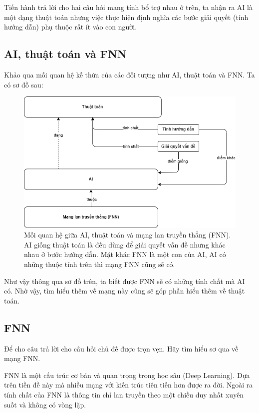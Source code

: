 	Tiến hành trả lời cho hai câu hỏi mang tính bổ trợ nhau ở trên, ta nhận ra AI là một dạng thuật toán nhưng việc thực hiện định nghĩa các bước giải quyết (tính hướng dẫn) phụ thuộc rất ít vào con người.

\subsection{AI, thuật toán và FNN}
	Khảo qua mối quan hệ kế thừa của các đối tượng như AI, thuật toán và FNN. Ta có sơ đồ sau:
	
	\begin{figure}[h]
		\centering
		\includegraphics[scale=0.6]{figures/ai_fnn_algorithm.png}
		\caption{Mối quan hệ giữa AI, thuật toán và mạng lan truyền thẳng (FNN). AI giống thuật toán là đều dùng để giải quyết vấn đề nhưng khác nhau ở bước hướng dẫn. Mặt khác FNN là một con của AI, AI có những thuộc tính trên thì mạng FNN cũng sẽ có.}
		\label{fig:ai_fnn_algo_relationship}
	\end{figure}  
	
	Như vậy thông qua sơ đồ trên, ta biết được FNN sẽ có những tính chất mà AI có. Nhờ vậy, tìm hiểu thêm về mạng này cũng sẽ góp phần hiểu thêm về thuật toán.
	
\subsection{FNN}
	Để cho câu trả lời cho câu hỏi chủ đề được trọn vẹn. Hãy tìm hiểu sơ qua về mạng FNN.
	
	FNN là một cấu trúc cơ bản và quan trọng trong học sâu (Deep Learning). Dựa trên tiền đề này mà nhiều mạng với kiến trúc tiên tiến hơn được ra đời. Ngoài ra tính chất của FNN là thông tin chỉ lan truyền theo một chiều duy nhất xuyên suốt và không có vòng lặp.
	
